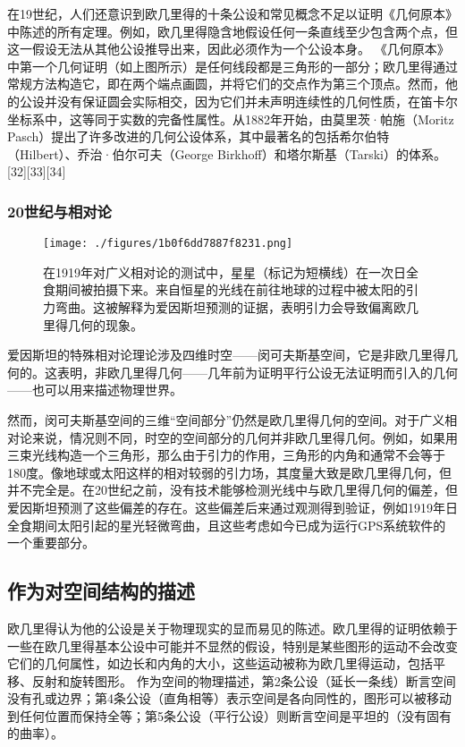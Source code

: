 在19世纪，人们还意识到欧几里得的十条公设和常见概念不足以证明《几何原本》中陈述的所有定理。例如，欧几里得隐含地假设任何一条直线至少包含两个点，但这一假设无法从其他公设推导出来，因此必须作为一个公设本身。 《几何原本》中第一个几何证明（如上图所示）是任何线段都是三角形的一部分；欧几里得通过常规方法构造它，即在两个端点画圆，并将它们的交点作为第三个顶点。然而，他的公设并没有保证圆会实际相交，因为它们并未声明连续性的几何性质，在笛卡尔坐标系中，这等同于实数的完备性属性。从1882年开始，由莫里茨·帕施（Moritz Pasch）提出了许多改进的几何公设体系，其中最著名的包括希尔伯特（Hilbert）、乔治·伯尔可夫（George Birkhoff）和塔尔斯基（Tarski）的体系。[32][33][34]
\subsubsection{20世纪与相对论}
\begin{figure}[ht]
\centering
\texttt{[image: ./figures/1b0f6dd7887f8231.png]}
\caption{在1919年对广义相对论的测试中，星星（标记为短横线）在一次日全食期间被拍摄下来。来自恒星的光线在前往地球的过程中被太阳的引力弯曲。这被解释为爱因斯坦预测的证据，表明引力会导致偏离欧几里得几何的现象。} \label{fig_OJLJH_27}
\end{figure}
爱因斯坦的特殊相对论理论涉及四维时空——闵可夫斯基空间，它是非欧几里得几何的。这表明，非欧几里得几何——几年前为证明平行公设无法证明而引入的几何——也可以用来描述物理世界。

然而，闵可夫斯基空间的三维“空间部分”仍然是欧几里得几何的空间。对于广义相对论来说，情况则不同，时空的空间部分的几何并非欧几里得几何。例如，如果用三束光线构造一个三角形，那么由于引力的作用，三角形的内角和通常不会等于180度。像地球或太阳这样的相对较弱的引力场，其度量大致是欧几里得几何，但并不完全是。在20世纪之前，没有技术能够检测光线中与欧几里得几何的偏差，但爱因斯坦预测了这些偏差的存在。这些偏差后来通过观测得到验证，例如1919年日全食期间太阳引起的星光轻微弯曲，且这些考虑如今已成为运行GPS系统软件的一个重要部分。
\subsection{作为对空间结构的描述}  
欧几里得认为他的公设是关于物理现实的显而易见的陈述。欧几里得的证明依赖于一些在欧几里得基本公设中可能并不显然的假设，特别是某些图形的运动不会改变它们的几何属性，如边长和内角的大小，这些运动被称为欧几里得运动，包括平移、反射和旋转图形。  
作为空间的物理描述，第2条公设（延长一条线）断言空间没有孔或边界；第4条公设（直角相等）表示空间是各向同性的，图形可以被移动到任何位置而保持全等；第5条公设（平行公设）则断言空间是平坦的（没有固有的曲率）。  

